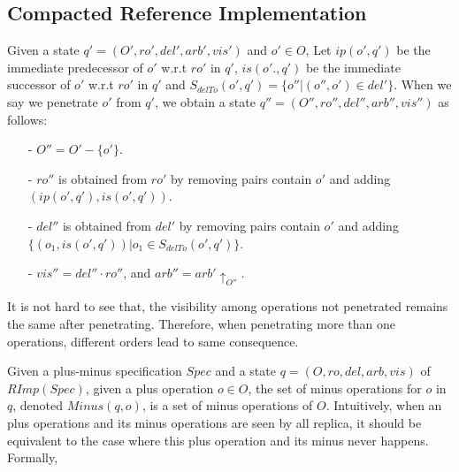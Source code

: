 \subsection{Compacted Reference Implementation}
\label{subsec:compacted reference implementation}

Given a state $q'=(O',ro',del',arb',vis')$ and $o' \in O$, Let $ip(o',q')$ be the immediate predecessor of $o'$ w.r.t $ro'$ in $q'$, $is(o'.,q')$ be the immediate successor of $o'$ w.r.t $ro'$ in $q'$ and $S_{delTo}(o',q') = \{o'' \vert (o'',o') \in del' \}$. When we say we penetrate $o'$ from $q'$, we obtain a state $q''=(O'',ro'',del'',arb'',vis'')$ as follows:

\begin{itemize}
\setlength{\itemsep}{0.5pt}
\item[-] $O'' = O' - \{ o' \}$.

\item[-] $ro''$ is obtained from $ro'$ by removing pairs contain $o'$ and adding $(ip(o',q'),is(o',q'))$.

\item[-] $del''$ is obtained from $del'$ by removing pairs contain $o'$ and adding $\{ (o_1,is(o',q')) \vert o_1 \in S_{delTo}(o',q')\}$.

\item[-] $vis'' = del'' \cdot ro''$, and $arb'' = arb' \uparrow_{O''}$.
\end{itemize}

It is not hard to see that, the visibility among operations not penetrated remains the same after penetrating. Therefore, when penetrating more than one operations, different orders lead to same consequence.

Given a plus-minus specification $Spec$ and a state $q=(O,ro,del,arb,vis)$ of $RImp(Spec)$, given a plus operation $o \in O$, the set of minus operations for $o$ in $q$, denoted $Minus(q,o)$, is a set of minus operations of $O$. Intuitively, when an plus operations and its minus operations are seen by all replica, it should be equivalent to the case where this plus operation and its minus never happens. Formally,

